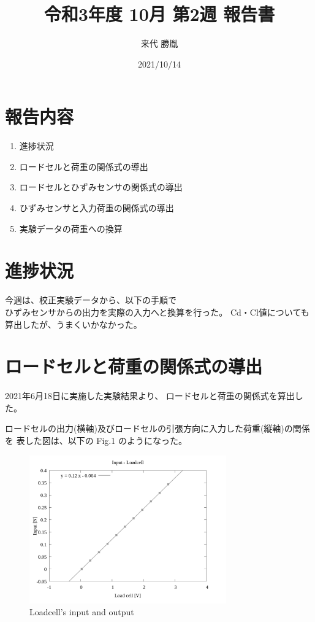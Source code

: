 \documentclass[twocolumn,a4j]{jsarticle}
\author{来代 勝胤}
\title{令和3年度 10月 第2週 報告書}
\date{2021/10/14}
\begin{document}
\columnseprule=0.1mm

\maketitle
\section*{報告内容}
\begin{enumerate}[1.]
    \item 進捗状況
    \item ロードセルと荷重の関係式の導出
    \item ロードセルとひずみセンサの関係式の導出
    \item ひずみセンサと入力荷重の関係式の導出
    \item 実験データの荷重への換算
\end{enumerate}
\section{進捗状況}
今週は、校正実験データから、以下の手順で\\
ひずみセンサからの出力を実際の入力へと換算を行った。
Cd・Cl値についても算出したが、うまくいかなかった。
\section{ロードセルと荷重の関係式の導出}
2021年6月18日に実施した実験結果より、
ロードセルと荷重の関係式を算出した。\par
ロードセルの出力(横軸)及びロードセルの引張方向に入力した荷重(縦軸)の関係を
表した図は、以下の Fig.1 のようになった。
\begin{figure}[htbp]
    \footnotesize
    \begin{center}
        \includegraphics[width=85mm]{images/02_force&line.png}
        \caption{Loadcell's input and output}
    \end{center}
\end{figure}
\end{document}
